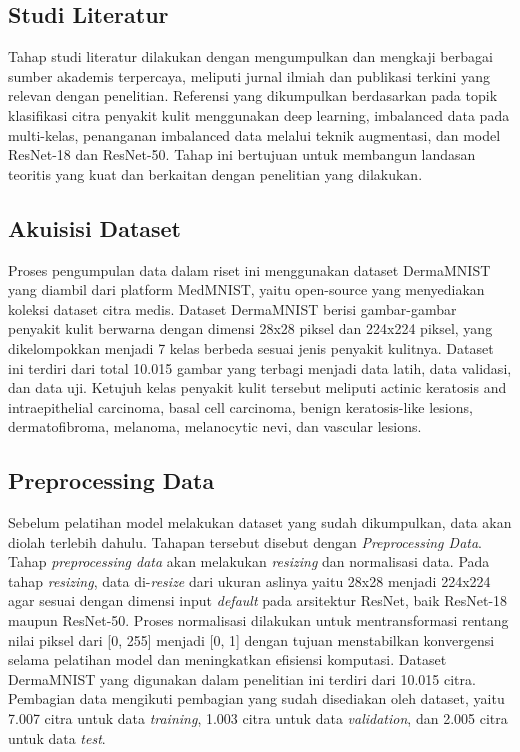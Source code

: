 \subsection{Studi Literatur} \label{III.Langkah 2}
Tahap studi literatur dilakukan dengan mengumpulkan dan mengkaji berbagai 
sumber akademis terpercaya, meliputi jurnal ilmiah dan publikasi terkini 
yang relevan dengan penelitian. Referensi yang dikumpulkan berdasarkan pada
topik klasifikasi citra penyakit kulit menggunakan deep learning, imbalanced 
data pada multi-kelas, penanganan imbalanced data melalui teknik augmentasi, 
dan model ResNet-18 dan ResNet-50. Tahap ini bertujuan untuk membangun 
landasan teoritis yang kuat dan berkaitan dengan penelitian yang dilakukan. \par

\subsection{Akuisisi Dataset} \label{III.Langkah 3}
Proses pengumpulan data dalam riset ini menggunakan dataset DermaMNIST yang 
diambil dari platform MedMNIST, yaitu open-source yang menyediakan koleksi 
dataset citra medis.  Dataset DermaMNIST berisi gambar-gambar penyakit kulit 
berwarna dengan dimensi 28x28 piksel dan 224x224 piksel, yang dikelompokkan 
menjadi 7 kelas berbeda sesuai jenis penyakit kulitnya. Dataset ini terdiri 
dari total 10.015 gambar yang terbagi menjadi data latih, data validasi, dan 
data uji. Ketujuh kelas penyakit kulit tersebut meliputi actinic keratosis 
and intraepithelial carcinoma, basal cell carcinoma, benign keratosis-like 
lesions, dermatofibroma, melanoma, melanocytic nevi, dan vascular lesions. \par

\subsection{Preprocessing Data} \label{III.Langkah 4}
Sebelum pelatihan model melakukan dataset yang sudah dikumpulkan, data akan 
diolah terlebih dahulu. Tahapan tersebut disebut dengan \textit{Preprocessing 
Data}. Tahap \textit{preprocessing data} akan melakukan \textit{resizing} dan 
normalisasi data. Pada tahap \textit{resizing}, data di-\textit{resize} dari 
ukuran aslinya yaitu 28x28 menjadi 224x224 agar sesuai dengan dimensi input 
\textit{default} pada arsitektur ResNet, baik ResNet-18 maupun ResNet-50. 
Proses normalisasi dilakukan untuk mentransformasi rentang nilai piksel dari 
[0, 255] menjadi [0, 1] dengan tujuan menstabilkan konvergensi selama 
pelatihan model dan meningkatkan efisiensi komputasi. Dataset DermaMNIST yang 
digunakan dalam penelitian ini terdiri dari 10.015 citra. Pembagian data 
mengikuti pembagian yang sudah disediakan oleh dataset, yaitu 7.007 citra 
untuk data \textit{training}, 1.003 citra untuk data \textit{validation}, 
dan 2.005 citra untuk data \textit{test}. \par

